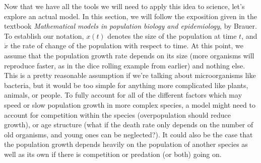 \documentclass[a5paper]{article}
\theoremstyle{definition}%
\numberwithin{exercise}{section}
\theoremstyle{remark}%
\begin{document}

Now that we have all the tools we will need to apply this idea to science, let's explore an actual model. In this section, we will follow the exposition given in the textbook \textit{Mathematical models in population biology and epidemiology}, by Brauer. To establish our notation, $x(t)$ denotes the size of the population at time $t$, and $\dot{x}$ the rate of change of the population with respect to time. At this point, we assume that the population growth rate depends on its size (more organisms will reproduce faster, as in the dice rolling example from earlier) and nothing else. This is a pretty reasonable assumption if we're talking about microorganisms like bacteria, but it would be too simple for anything more complicated like plants, animals, or people. To fully account for all of the different factors which may speed or slow population growth in more complex species, a model might need to account for competition within the species (overpopulation should reduce growth), or age structure (what if the death rate only depends on the number of old organisms, and young ones can be neglected?). It could also be the case that the population growth depends heavily on the population of another species as well as its own if there is competition or predation (or both) going on. 
\end{document}

